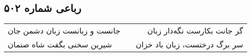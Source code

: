 \begin{center}
\section*{رباعی شماره ۵۰۲}
\label{sec:sh502}
\begin{longtable}{l p{0.5cm} r}
جانست و زبانست زبان دشمن جان
&&
گر جانت بکارست نگه‌دار زبان
\\
شیرین سخنی بگفت شاه صنمان
&&
سر برگ درختست، زبان باد خزان
\\
\end{longtable}
\end{center}
